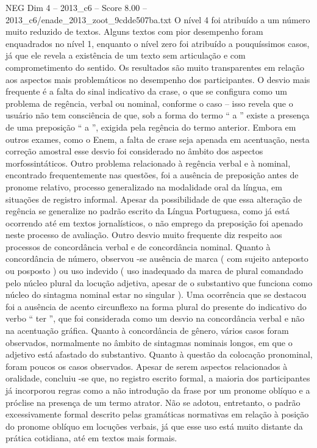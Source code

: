 \begin{textsample}{NEG Dim 4 – 2013\_c6 – Score 8.00 – 2013\_c6/enade\_2013\_zoot\_9cdde507ba.txt}
O nível 4 foi atribuído a um número muito reduzido de textos.
Alguns textos com pior desempenho foram enquadrados no nível 1, enquanto o nível zero foi atribuído a pouquíssimos casos, já que ele revela a existência de um texto sem articulação e com comprometimento do sentido.
Os resultados são muito transparentes em relação aos aspectos mais problemáticos no desempenho dos participantes.
O desvio mais frequente é a falta do sinal indicativo da crase, o que se configura como um problema de regência, verbal ou nominal, conforme o caso – isso revela que o usuário não tem consciência de que, sob a forma do termo “ a ” existe a presença de uma preposição “ a ”, exigida pela regência do termo anterior.
Embora em outros exames, como o Enem, a falta de crase seja apenada em acentuação, nesta correção amostral esse desvio foi considerado no âmbito dos aspectos morfossintáticos.
Outro problema relacionado à regência verbal e à nominal, encontrado frequentemente nas questões, foi a ausência de preposição antes de pronome relativo, processo generalizado na modalidade oral da língua, em situações de registro informal.
Apesar da possibilidade de que essa alteração de regência se generalize no padrão escrito da Língua Portuguesa, como já está ocorrendo até em textos jornalísticos, o não emprego da preposição foi apenado neste processo de avaliação.
Outro desvio muito frequente diz respeito aos processos de concordância verbal e de concordância nominal.
Quanto à concordância de número, observou -se ausência de marca ( com sujeito anteposto ou posposto ) ou uso indevido ( uso inadequado da marca de plural comandado pelo núcleo plural da locução adjetiva, apesar de o substantivo que funciona como núcleo do sintagma nominal estar no singular ).
Uma ocorrência que se destacou foi a ausência de acento circunflexo na forma plural do presente do indicativo do verbo “ ter ”, que foi considerada como um desvio na concordância verbal e não na acentuação gráfica.
Quanto à concordância de gênero, vários casos foram observados, normalmente no âmbito de sintagmas nominais longos, em que o adjetivo está afastado do substantivo.
Quanto à questão da colocação pronominal, foram poucos os casos observados.
Apesar de serem aspectos relacionados à oralidade, concluiu -se que, no registro escrito formal, a maioria dos participantes já incorporou regras como a não introdução da frase por um pronome oblíquo e a próclise na presença de um termo atrator.
Não se adotou, entretanto, o padrão excessivamente formal descrito pelas gramáticas normativas em relação à posição do pronome oblíquo em locuções verbais, já que esse uso está muito distante da prática cotidiana, até em textos mais formais.

\end{textsample}
